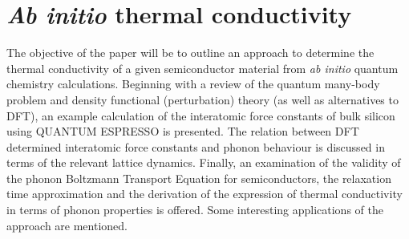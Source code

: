 \documentclass{article}
\numberwithin{equation}{section}
\begin{document}
\section*{\textit{Ab initio} thermal conductivity}

The objective of the paper will be to outline an approach to determine the thermal conductivity of a given semiconductor material from \textit{ab initio} quantum chemistry calculations. Beginning with a review of the quantum many-body problem and density functional (perturbation) theory (as well as alternatives to DFT), an example calculation of the interatomic force constants of bulk silicon using QUANTUM ESPRESSO is presented. The relation between DFT determined interatomic force constants and phonon behaviour is discussed in terms of the relevant lattice dynamics. Finally, an examination of the validity of the phonon Boltzmann Transport Equation for semiconductors, the relaxation time approximation and the derivation of the expression of thermal conductivity in terms of phonon properties is offered. Some interesting applications of the approach are mentioned.
 	
\end{document}
